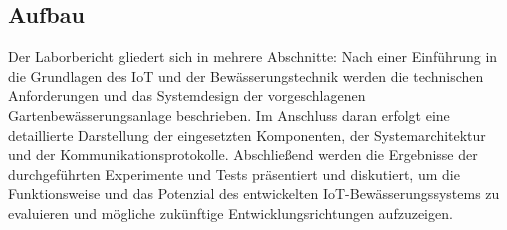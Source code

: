 \subsection{Aufbau}

Der Laborbericht gliedert sich in mehrere Abschnitte: Nach einer Einführung in die Grundlagen des IoT und der Bewässerungstechnik werden die technischen Anforderungen und das Systemdesign der vorgeschlagenen Gartenbewässerungsanlage beschrieben. Im Anschluss daran erfolgt eine detaillierte Darstellung der eingesetzten Komponenten, der Systemarchitektur und der Kommunikationsprotokolle. Abschließend werden die Ergebnisse der durchgeführten Experimente und Tests präsentiert und diskutiert, um die Funktionsweise und das Potenzial des entwickelten IoT-Bewässerungssystems zu evaluieren und mögliche zukünftige Entwicklungsrichtungen aufzuzeigen.